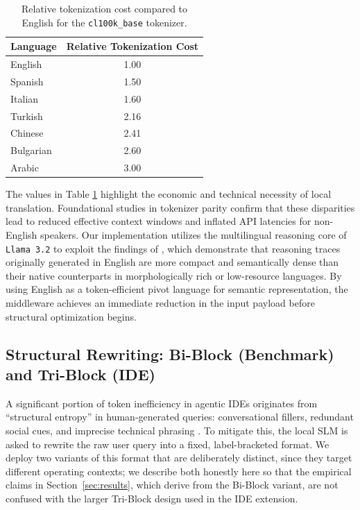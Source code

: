 \documentclass[11pt,a4paper,twocolumn]{article}
\begin{document}
\begin{table}[h]
\centering
\small
\begin{tabular}{lc}
\toprule
\textbf{Language} & \textbf{Relative Tokenization Cost} \\
\midrule
English & 1.00 \\
Spanish & 1.50 \\
Italian & 1.60 \\
Turkish & 2.16 \\
Chinese & 2.41 \\
Bulgarian & 2.60 \\
Arabic & 3.00 \\
\bottomrule
\end{tabular}
\caption{Relative tokenization cost compared to English for the \texttt{cl100k\_base} tokenizer.}
\label{tab:tokenization-overhead}
\end{table}

The values in Table \ref{tab:tokenization-overhead} highlight the economic and technical necessity of local translation. Foundational studies in tokenizer parity \cite{petrov2023language, teklehaymanot2025tokenization} confirm that these disparities lead to reduced effective context windows and inflated API latencies for non-English speakers. Our implementation utilizes the multilingual reasoning core of \texttt{Llama 3.2} \cite{meta2024llama32} to exploit the findings of \cite{ahuja2025efficientxlang}, which demonstrate that reasoning traces originally generated in English are more compact and semantically dense than their native counterparts in morphologically rich or low-resource languages. By using English as a token-efficient pivot language for semantic representation, the middleware achieves an immediate reduction in the input payload before structural optimization begins.

\subsection{Structural Rewriting: Bi-Block (Benchmark) and Tri-Block (IDE)}
\label{sec:structure}
A significant portion of token inefficiency in agentic IDEs originates from ``structural entropy'' in human-generated queries: conversational fillers, redundant social cues, and imprecise technical phrasing \cite{jiang2023llmlingua}. To mitigate this, the local SLM is asked to rewrite the raw user query into a fixed, label-bracketed format. We deploy two variants of this format that are deliberately distinct, since they target different operating contexts; we describe both honestly here so that the empirical claims in Section~\ref{sec:results}, which derive from the Bi-Block variant, are not confused with the larger Tri-Block design used in the IDE extension.
\end{document}
